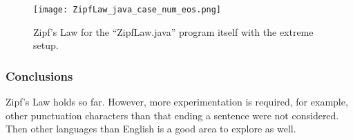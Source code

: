 \begin{figure}
	\begin{center}
	\texttt{[image: ZipfLaw\_java\_case\_num\_eos.png]}
	\caption{Zipf's Law for the ``ZipfLaw.java'' program itself with the extreme setup.}
	\end{center}
\end{figure}

\subsubsection{Conclusions}

Zipf's Law holds so far. However, more experimentation is required,
for example, other punctuation characters than
that ending a sentence were not considered. Then other languages than English is a good
area to explore as well.

